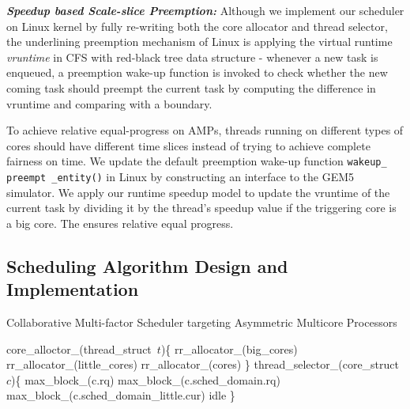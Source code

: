 \documentclass[10pt,conference]{IEEEtran}
\begin{document}
\textbf{\textit {Speedup based Scale-slice Preemption:}} Although we implement our scheduler on Linux kernel by fully re-writing both the core allocator and thread selector, the underlining preemption mechanism of Linux is applying the virtual runtime {\it vruntime} in CFS with red-black tree data structure - whenever a new task is enqueued, a preemption wake-up function is invoked to check whether the new coming task should preempt the current task by computing the difference in vruntime and comparing with a boundary. 

To achieve relative equal-progress on AMPs, threads running on different types of cores should have different time slices instead of trying to achieve complete fairness on time. We update the default preemption wake-up function \texttt{wakeup\_ preempt \_entity()} in Linux by constructing an interface to the GEM5 simulator. We apply our runtime speedup model to update the vruntime of the current task by dividing it by the thread's speedup value if the triggering core is a big core. The ensures relative equal progress.




\subsection{Scheduling Algorithm Design and Implementation}
\begin{algorithm}
\caption{Collaborative Multi-factor Scheduler targeting Asymmetric Multicore Processors}
\label{alg:1}
\begin{algorithmic}[1]
\STATE core\_alloctor\_(thread\_struct\ $t$)\{
\RETURN rr\_allocator\_(big\_cores)
\ENDIF
{}
\RETURN rr\_allocator\_(little\_cores)
\ENDIF
\RETURN rr\_allocator\_(cores)
\STATE \}
\STATE thread\_selector\_(core\_struct\ $c$)\{
\RETURN max\_block\_(c.rq)
\ENDIF
\RETURN max\_block\_(c.sched\_domain.rq)
\ENDIF
{}
\RETURN  max\_block\_(c.sched\_domain\_little.cur)
\ENDIF
\RETURN idle
\STATE \}
\end{algorithmic}
\end{algorithm}
\end{document}
